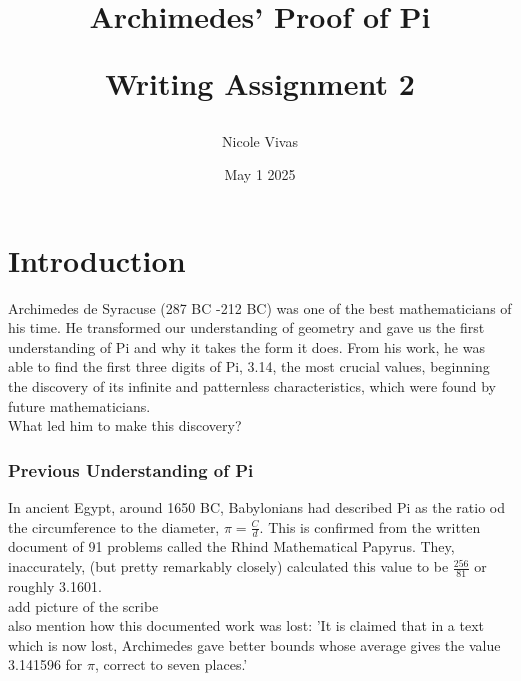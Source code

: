 \documentclass{article}
\title{Archimedes' Proof of Pi \\ 
\begin{large} 
Writing Assignment 2
\end{large}}
\author{Nicole Vivas}
\date{May 1 2025}
\begin{document}
\maketitle



\section*{Introduction}
Archimedes de Syracuse (287 BC -212 BC) was one of the best mathematicians of his time. He transformed our understanding of geometry and gave us the first understanding of Pi and why it takes the form it does. From his work, he was able to find the first three digits of Pi, 3.14, the most crucial values, beginning the discovery of its infinite and patternless characteristics, which were found by future mathematicians.\\

\textcolor{Periwinkle}{What led him to make this discovery?}

\subsubsection*{Previous Understanding of Pi}


In ancient Egypt, around 1650 BC, Babylonians had described Pi as the ratio od the circumference to the diameter, $\pi = \frac{C}{d}$. This is confirmed from the written document of 91 problems called the Rhind Mathematical Papyrus. They, inaccurately, (but pretty remarkably closely) calculated this value to be $\frac{256}{81}$ or roughly 3.1601. \\

\textcolor{Periwinkle}{add picture of the scribe}\\

\textcolor{Periwinkle}{also mention how this documented work was lost: 'It is claimed that in a text which is now lost, Archimedes gave better bounds whose average gives the value 3.141596 for $\pi$, correct to seven places.'}
\end{document}
